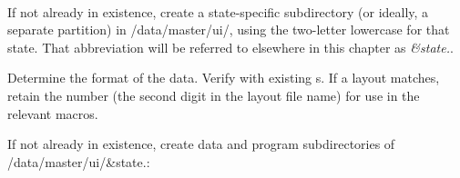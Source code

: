\begin{description}
\item \ 


  \begin{steps}
  \item If not already in existence, create a state-specific subdirectory
    (or ideally, a separate partition) in /data/master/ui/, using the
    two-letter lowercase  for that state. That
    abbreviation will be referred to elsewhere in this chapter as
    \textit{\&state.}.
  \item Determine the format of the data. Verify with existing
    s. If a layout matches, retain the number (the second
    digit in the layout file name) for use in the relevant macros.
  \item If not already in existence, create data and program subdirectories
    of /data/master/ui/\&state.:


\end{steps}
\end{description}
